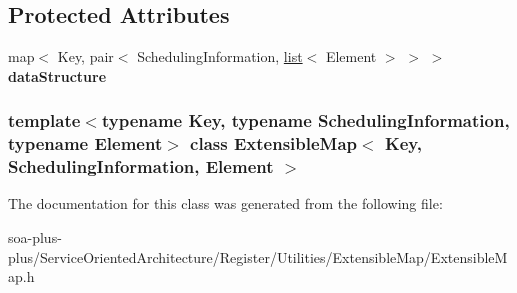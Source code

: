 \subsection*{Protected Attributes}
\begin{DoxyCompactItemize}
\item 
\hypertarget{class_extensible_map_afda3f6d4af4d0f016efde35b47a794f1}{
map$<$ Key, pair$<$ SchedulingInformation, \hyperlink{classlist}{list}$<$ Element $>$ $>$ $>$ {\bfseries dataStructure}}
\label{class_extensible_map_afda3f6d4af4d0f016efde35b47a794f1}

\end{DoxyCompactItemize}
\subsubsection*{template$<$typename Key, typename SchedulingInformation, typename Element$>$ class ExtensibleMap$<$ Key, SchedulingInformation, Element $>$}



The documentation for this class was generated from the following file:\begin{DoxyCompactItemize}
\item 
soa-\/plus-\/plus/ServiceOrientedArchitecture/Register/Utilities/ExtensibleMap/ExtensibleMap.h\end{DoxyCompactItemize}
